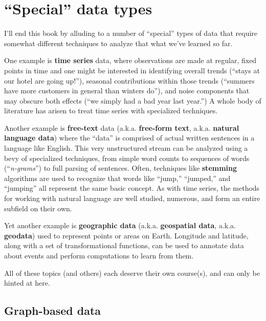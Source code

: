 
\chapter{``Special'' data types}

I'll end this book by alluding to a number of ``special'' types of data that
require somewhat different techniques to analyze that what we've learned so
far.


One example is \textbf{time series} data, where observations are made at
regular, fixed points in time and one might be interested in identifying
overall trends (``stays at our hotel are going up!''), seasonal contributions
within those trends (``summers have more customers in general than winters
do''), and noise components that may obscure both effects (``we simply had a
bad year last year.'') A whole body of literature has arisen to treat time
series with specialized techniques.


Another example is \textbf{free-text} data (a.k.a. \textbf{free-form text},
a.k.a. \textbf{natural language data}) where the ``data'' is comprised of
actual written sentences in a language like English. This very unstructured
stream can be analyzed using a bevy of specialized techniques, from simple word
counts to sequences of words (``\textit{n-grams}'') to full parsing of
sentences. Often, techniques like \textbf{stemming} algorithms are used to
recognize that words like ``jump,'' ``jumped,'' and ``jumping'' all represent
the same basic concept. As with time series, the methods for working with
natural language are well studied, numerous, and form an entire subfield on
their own.


Yet another example is \textbf{geographic data} (a.k.a. \textbf{geospatial
data}, a.k.a. \textbf{geodata}) used to represent points or areas on Earth.
Longitude and latitude, along with a set of transformational functions, can be
used to annotate data about events and perform computations to learn from them.

All of these topics (and others) each deserve their own course(s), and can only
be hinted at here.

\section{Graph-based data}

